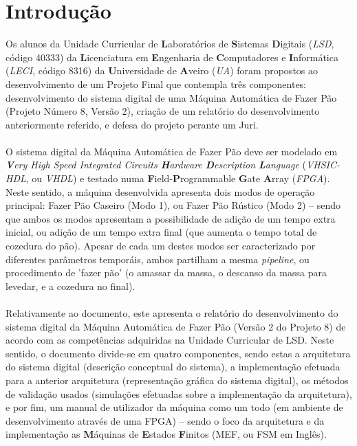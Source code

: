 \documentclass{report}
\begin{document}
%
%
\def\titulo{Projeto Final de Laboratório de Sistemas Digitais}
\def\data{01 de Junho de 2023}
\def\autores{Olha Buts, André Correia}
\def\autorescontactos{(112920) o.buts@ua.pt, (87818) amcorreia@ua.pt}
\def\versao{VERSÃO 1}
\def\departamento{Dept. de Eletrónica, Telecomunicações e Informática}
\def\empresa{Universidade de Aveiro}
\def\logotipo{ua.pdf}



\clearpage
{}

\chapter{Introdução}
\label{chap.introducao}
Os alunos da Unidade Curricular de \textbf{L}aboratórios de \textbf{S}istemas \textbf{D}igitais (\textit{LSD}, código 40333) da \textbf{L}icenciatura em \textbf{E}ngenharia de \textbf{C}omputadores e \textbf{I}nformática (\textit{LECI}, código 8316) da \textbf{U}niversidade de \textbf{A}veiro (\textit{UA}) foram propostos ao desenvolvimento de um Projeto Final que contempla três componentes: desenvolvimento do sistema digital de uma Máquina Automática de Fazer Pão (Projeto Número 8, Versão 2), criação de um relatório do desenvolvimento anteriormente referido, e defesa do projeto perante um Juri.
\\\\
O sistema digital da Máquina Automática de Fazer Pão deve ser modelado em \textit{\textbf{V}ery High Speed Integrated Circuits \textbf{H}ardware \textbf{D}escription \textbf{L}anguage} (\textit{VHSIC-HDL}, ou \textit{VHDL}) e testado numa \textbf{F}ield-\textbf{P}rogrammable \textbf{G}ate \textbf{A}rray (\textit{FPGA}). Neste sentido, a máquina desenvolvida apresenta dois modos de operação principal: Fazer Pão Caseiro (Modo 1), ou Fazer Pão Rústico (Modo 2) -- sendo que ambos os modos apresentam a possibilidade de adição de um tempo extra inicial, ou adição de um tempo extra final (que aumenta o tempo total de cozedura do pão). Apesar de cada um destes modos ser caracterizado por diferentes parâmetros temporáis, ambos partilham a mesma \textit{pipeline}, ou procedimento de 'fazer pão'  (o amassar da massa, o descanso da massa para levedar, e a cozedura no final).
\\\\
Relativamente ao documento, este apresenta o relatório do desenvolvimento do sistema digital da Máquina Automática de Fazer Pão (Versão 2 do Projeto 8) de acordo com as competências adquiridas na Unidade Curricular de LSD.
Neste sentido, o documento divide-se em quatro componentes, sendo estas a arquitetura do sistema digital (descrição conceptual do sistema), a implementação efetuada para a anterior arquitetura (representação gráfica do sistema digital), os métodos de validação usados (simulações efetuadas sobre a implementação da arquitetura), e por fim, um manual de utilizador da máquina como um todo (em ambiente de desenvolvimento através de uma FPGA) -- sendo o foco da arquitetura e da implementação as \textbf{M}áquinas de \textbf{E}stados \textbf{F}initos (MEF, ou FSM em Inglês).
\end{document}
